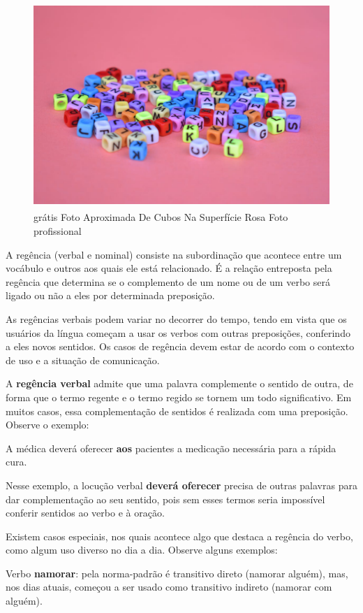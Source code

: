 \begin{itemize}
\begin{itemize}
{\begin{figure}
\centering
\includegraphics[width=4.56250in,height=3.06080in]{./_SAEB_9_POR/media/image30.jpeg}
\caption{grátis Foto Aproximada De Cubos Na Superfície Rosa Foto
profissional}
\end{figure}

A regência (verbal e nominal) consiste na subordinação que acontece
entre um vocábulo e outros aos quais ele está relacionado. É a relação
entreposta pela regência que determina se o complemento de um nome ou de
um verbo será ligado ou não a eles por determinada preposição.

As regências verbais podem variar no decorrer do tempo, tendo em vista
que os usuários da língua começam a usar os verbos com outras
preposições, conferindo a eles novos sentidos. Os casos de regência
devem estar de acordo com o contexto de uso e a situação de comunicação.

A \textbf{regência verbal} admite que uma palavra complemente o sentido
de outra, de forma que o termo regente e o termo regido se tornem um
todo significativo. Em muitos casos, essa complementação de sentidos é
realizada com uma preposição. Observe o exemplo:

A médica deverá oferecer \textbf{aos} pacientes a medicação necessária
para a rápida cura.

Nesse exemplo, a locução verbal \textbf{deverá oferecer} precisa de
outras palavras para dar complementação ao seu sentido, pois sem esses
termos seria impossível conferir sentidos ao verbo e à oração.

Existem casos especiais, nos quais acontece algo que destaca a regência
do verbo, como algum uso diverso no dia a dia. Observe alguns exemplos:

Verbo \textbf{namorar}: pela norma-padrão é transitivo direto (namorar
alguém), mas, nos dias atuais, começou a ser usado como transitivo
indireto (namorar com alguém).

}
\end{itemize}
\end{itemize}
